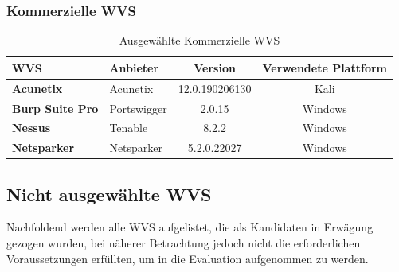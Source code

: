 \documentclass[12pt,oneside,a4paper,parskip]{scrbook}
\begin{document}
    \subsubsection{Kommerzielle WVS}
      \begin{table}[H]
        \centering
          \begin{tabular}{|p{4cm}|l|c|c|}
            \hline
            \textbf{WVS}            & \textbf{Anbieter} & \textbf{Version} & \textbf{Verwendete Plattform}  \\
            \hline
            \textbf{Acunetix}       & Acunetix          & 12.0.190206130   & Kali                          \\
            \hline
            \textbf{Burp Suite Pro} & Portswigger       & 2.0.15           & Windows                       \\
            \hline
            \textbf{Nessus}         & Tenable           & 8.2.2            & Windows                       \\
            \hline
            \textbf{Netsparker}     & Netsparker        & 5.2.0.22027      & Windows                       \\
            \hline
          \end{tabular}
        \caption[Ausgewählte Kommerzielle WVS]{Ausgewählte Kommerzielle WVS}
      \end{table}
\newpage
  \subsection{Nicht ausgewählte WVS}
    Nachfoldend werden alle WVS aufgelistet, die als Kandidaten in Erwägung gezogen wurden, bei näherer Betrachtung jedoch nicht die erforderlichen Voraussetzungen erfüllten, um in die Evaluation aufgenommen zu werden.
\end{document}

